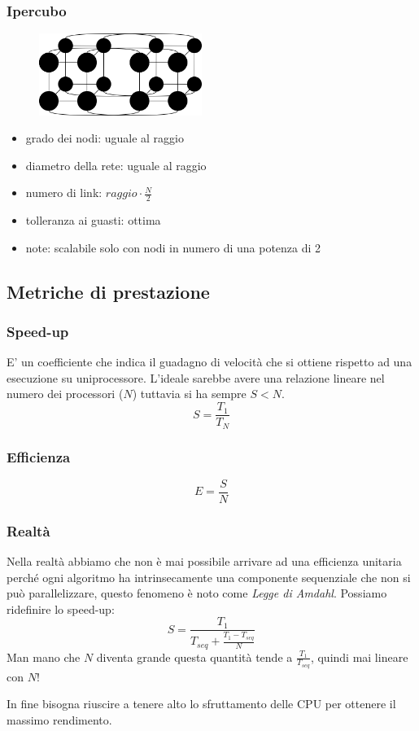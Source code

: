 \subsubsection{Ipercubo}
\begin{figure}[H]
    \centering
    \includegraphics[width=200px]{images/2_Tassonomia_di_Flynn/ipercubo-topology.png}
\end{figure}

\begin{itemize}
    \item grado dei nodi: uguale al raggio
    \item diametro della rete: uguale al raggio
    \item numero di link: $raggio \cdot \frac{N}{2}$
    \item tolleranza ai guasti: ottima
    \item note: scalabile solo con nodi in numero di una potenza di 2
\end{itemize}

\subsection{Metriche di prestazione}
\subsubsection{Speed-up}
E' un coefficiente che indica il guadagno di velocità che si ottiene rispetto ad una esecuzione su uniprocessore.
L'ideale sarebbe avere una relazione lineare nel numero dei processori ($N$) tuttavia si ha sempre $S < N$.
$$ S = \frac{T_1}{T_N} $$

\subsubsection{Efficienza}
$$ E = \frac{S}{N} $$

\subsubsection{Realtà}
Nella realtà abbiamo che non è mai possibile arrivare ad una efficienza unitaria perché ogni algoritmo ha intrinsecamente una componente sequenziale che non si può parallelizzare, questo fenomeno è noto come \emph{Legge di Amdahl}.
Possiamo ridefinire lo speed-up:
$$ S = \frac{T_1}{T_{seq} + \frac{T_1 - T_{seq}}{N}} $$
Man mano che $N$ diventa grande questa quantità tende a $\frac{T_1}{T_{seq}}$, quindi mai lineare con $N$!

In fine bisogna riuscire a tenere alto lo sfruttamento delle CPU per ottenere il massimo rendimento.

